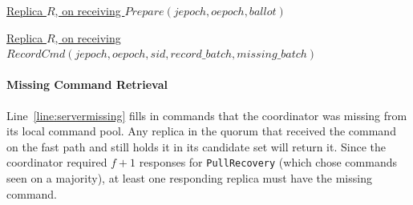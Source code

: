 \documentclass[twocolumn]{article}
\begin{document}
\begin{algorithm}
\caption{Server -- $OnPrepare$}
\label{alg:on_prepare}
\setcounter{AlgoLine}{88}

\underline{Replica $R$, on receiving $Prepare(jepoch, oepoch, ballot)$}\\
\end{algorithm}


\begin{algorithm}
\caption{Server -- $OnRecordCmd$}
\label{alg:on_record_cmd}
\setcounter{AlgoLine}{97}

\underline{Replica $R$, on receiving $RecordCmd(jepoch, oepoch, sid, record\_batch, missing\_batch)$}\\
\end{algorithm}

\paragraph{Missing Command Retrieval}
Line~\ref{line:servermissing} fills in commands that the coordinator was missing from its local command pool. Any replica in the quorum that received the command on the fast path and still holds it in its candidate set will return it. Since the coordinator required $f+1$ responses for \texttt{PullRecovery} (which chose commands seen on a majority), at least one responding replica must have the missing command.
\end{document}
